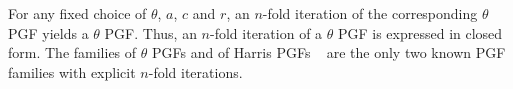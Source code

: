 \documentclass[final, 12pt]{colt2021} %
\begin{document}
For any fixed choice of $\theta$, $a$, $c$ and $r$,
an $n$-fold iteration of the corresponding $\theta$ PGF
yields a $\theta$ PGF.
Thus, an $n$-fold iteration of a $\theta$ PGF is expressed in closed form.
The families of $\theta$ PGFs and of Harris PGFs
~\citep[p. 10]{harris1972}
are the only two known PGF families
with explicit $n$-fold iterations.







\end{document}
